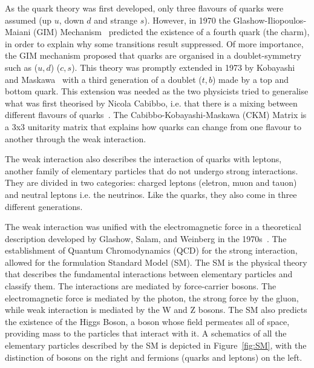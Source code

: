 As the quark theory was first developed, only three flavours of quarks were assumed (up $u$, down $d$ and strange $s$). However, in 1970 the Glashow-Iliopoulos-Maiani (GIM) Mechanism~\cite{Glashow:1970gm} predicted the existence of a fourth quark (the charm), in order to explain why some transitions result suppressed. Of more importance, the GIM mechanism proposed that quarks are organised in a doublet-symmetry such as ($u,d$) ($c,s$). This theory was promptly extended in 1973 by Kobayashi and Maskawa~\cite{Kobayashi:1973fv} with a third generation of a doublet ($t,b$) made by a top and bottom quark. This extension was needed as the two physicists tried to generalise what was first theorised by Nicola Cabibbo, i.e. that there is a mixing between different flavours of quarks~\cite{Cabibbo:1963yz}. The Cabibbo-Kobayashi-Maskawa (CKM) Matrix is a 3x3 unitarity matrix that explains how quarks can change from one flavour to another through the weak interaction. 

The weak interaction also describes the interaction of quarks with leptons, another family of elementary particles that do not undergo strong interactions. They are divided in two categories: charged leptons (eletron, muon and tauon) and neutral leptons i.e. the neutrinos. Like the quarks, they also come in three different generations.  

The weak interaction was unified with the electromagnetic force in a theoretical description developed by Glashow, Salam, and Weinberg in the 1970s~\cite{Glashow:1961tr, Weinberg:1967tq, Salam:1968rm, Georgi:1974sy}. The establishment of Quantum Chromodynamics (QCD) for the strong interaction, allowed for the formulation Standard Model (SM). The SM is the physical theory that describes the fundamental interactions between elementary particles and classify them. The interactions are mediated by force-carrier bosons. The electromagnetic force is mediated by the photon, the strong force by the gluon, while weak interaction is mediated by the W and Z bosons. The SM also predicts the existence of the Higgs Boson, a boson whose field permeates all of space, providing mass to the particles that interact with it. A schematics of all the elementary particles described by the SM is depicted in Figure~\ref{fig:SM}, with the distinction of bosons on the right and fermions (quarks and leptons) on the left. 

